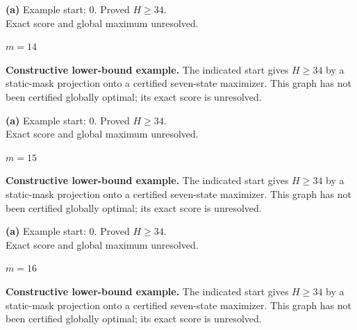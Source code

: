 \documentclass[11pt,a4paper]{article}
\begin{document}
\begin{minipage}[t]{.94\textwidth}\centering
\resizebox{10.3cm}{!}{}\par
\small\textbf{(a)} Example start: $0$. Proved $H\ge34$.\\Exact score and global maximum unresolved.\par\end{minipage}
\clearpage
{\LARGE\bfseries $m=14$}\par\vspace{3mm}
\textbf{Constructive lower-bound example.} The indicated start gives $H\ge34$ by a static-mask projection onto a certified seven-state maximizer. This graph has not been certified globally optimal; its exact score is unresolved.\par\vspace{3mm}
\begin{minipage}[t]{.94\textwidth}\centering
\resizebox{10.3cm}{!}{}\par
\small\textbf{(a)} Example start: $0$. Proved $H\ge34$.\\Exact score and global maximum unresolved.\par\end{minipage}
\clearpage
{\LARGE\bfseries $m=15$}\par\vspace{3mm}
\textbf{Constructive lower-bound example.} The indicated start gives $H\ge34$ by a static-mask projection onto a certified seven-state maximizer. This graph has not been certified globally optimal; its exact score is unresolved.\par\vspace{3mm}
\begin{minipage}[t]{.94\textwidth}\centering
\resizebox{10.3cm}{!}{}\par
\small\textbf{(a)} Example start: $0$. Proved $H\ge34$.\\Exact score and global maximum unresolved.\par\end{minipage}
\clearpage
{\LARGE\bfseries $m=16$}\par\vspace{3mm}
\textbf{Constructive lower-bound example.} The indicated start gives $H\ge34$ by a static-mask projection onto a certified seven-state maximizer. This graph has not been certified globally optimal; its exact score is unresolved.\par\vspace{3mm}
\end{document}
